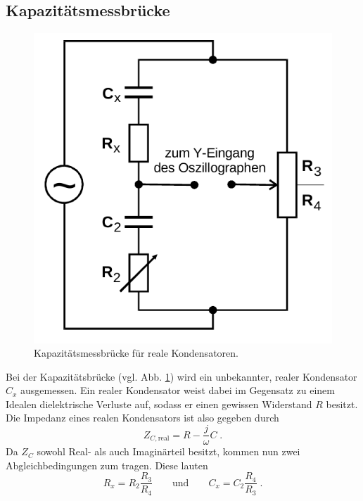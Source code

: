 \subsection{Kapazitätsmessbrücke}            
\label{sec:Cbrücke}
\begin{figure}[H]
    \centering
    \includegraphics[scale=0.4]{pictures/3-C.png}
    \caption{Kapazitätsmessbrücke für reale Kondensatoren. \cite{AP01}}
    \label{fig:Cbrücke}
\end{figure}
\noindent
Bei der Kapazitätsbrücke (vgl. Abb. \ref{fig:Cbrücke}) wird ein unbekannter, realer Kondensator $C_x$ ausgemessen. Ein realer Kondensator 
weist dabei im Gegensatz zu einem Idealen dielektrische Verluste auf, sodass er einen gewissen Widerstand $R$ besitzt. Die Impedanz 
eines realen Kondensators ist also gegeben durch 
\begin{equation}
    Z_{C,\text{real}}=R-\frac{j}{\omega}C \;.
\end{equation}
Da $Z_C$ sowohl Real- als auch Imaginärteil besitzt, kommen nun zwei Abgleichbedingungen zum tragen. Diese lauten 
\begin{equation}
    R_x=R_2\frac{R_3}{R_4} 
    \qquad\text{und}\qquad
    C_x=C_2\frac{R_4}{R_3} \;.
    \label{eqn:Cbrücke}
\end{equation}

